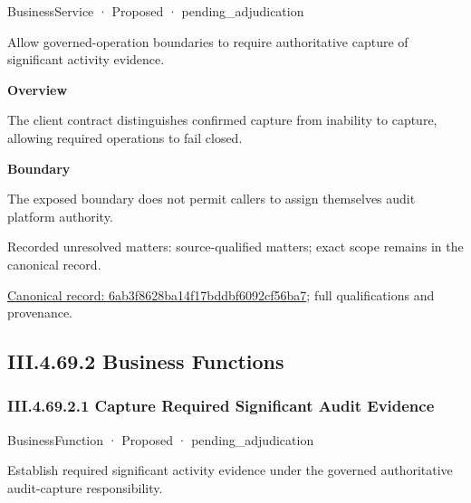 \label{element:6ab3f8628ba14f17bddbf6092cf56ba7}
{\small BusinessService · Proposed · pending\_adjudication}\par

Allow governed-operation boundaries to require authoritative capture of significant activity evidence.



\textbf{Overview}



The client contract distinguishes confirmed capture from inability to capture, allowing required operations to fail closed.



\textbf{Boundary}



The exposed boundary does not permit callers to assign themselves audit platform authority.


{\small Recorded unresolved matters: source-qualified matters; exact scope remains in the canonical record.}\par
{\footnotesize \href{../../../../continuum/business/business-service/6ab3f8628ba14f17bddbf6092cf56ba7.md}{Canonical record: 6ab3f8628ba14f17bddbf6092cf56ba7}; full qualifications and provenance.}\par
\subsection*{III.4.69.2 Business Functions}
\label{navigation:III.4.69.2}

\subsubsection*{III.4.69.2.1 Capture Required Significant Audit Evidence}
\label{navigation:III.4.69.2.1}

\label{element:c8e614257cf14bd1878df894455f21fb}
{\small BusinessFunction · Proposed · pending\_adjudication}\par

Establish required significant activity evidence under the governed authoritative audit-capture responsibility.




